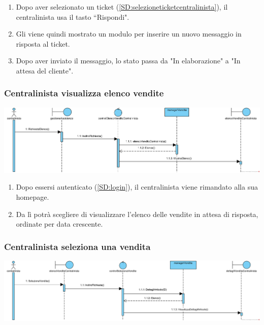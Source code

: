 \documentclass[12pt]{article}
\begin{document}
\begin{enumerate}
\item Dopo aver selezionato un ticket (\ref{SD:selezioneticketcentralinista}), il centralinista usa il tasto ``Rispondi".
\item Gli viene quindi mostrato un modulo per inserire un nuovo messaggio in risposta al ticket.
\item Dopo aver inviato il messaggio, lo stato passa da "In elaborazione" a "In attesa del cliente".
\end{enumerate}

\subsubsection{Centralinista visualizza elenco vendite}
\label{SD:elencovenditecentralinista}

\begin{center}
\includegraphics[width=\textwidth]{SequenceDiagram/CentralinistaVenditeElenco}
\end{center}

\begin{enumerate}
\item Dopo essersi autenticato (\ref{SD:login}), il centralinista viene rimandato alla sua homepage. 
\item Da lì potrà scegliere di visualizzare l'elenco delle vendite in attesa di risposta, ordinate per data crescente.
\end{enumerate}

\newpage

\subsubsection{Centralinista seleziona una vendita}
\label{SD:selezionevenditacentralinista}

\begin{center}
\includegraphics[width=\textwidth]{SequenceDiagram/CentralinistaVenditaSeleziona}
\end{center}
\end{document}
